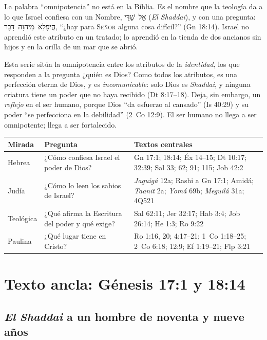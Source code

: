 \documentclass[11pt,letterpaper]{article}
\newcommand{\heb}[1]{\mbox{\foreignlanguage{hebrew}{#1}}}
\newcommand{\SENOR}{\textsc{Señor}}
\begin{document}
La palabra ``omnipotencia'' no está en la Biblia. Es el nombre que la teología da a lo que Israel confiesa con un Nombre, \heb{אֵל שַׁדַּי} (\emph{El Shaddai}), y con una pregunta: \heb{הֲיִפָּלֵא מֵיְהוָה דָּבָר}, ``¿hay para \SENOR{} alguna cosa difícil?'' (Gn 18:14). Israel no aprendió este atributo en un tratado; lo aprendió en la tienda de dos ancianos sin hijos y en la orilla de un mar que se abrió.

Esta serie sitúa la omnipotencia entre los atributos de la \emph{identidad}, los que responden a la pregunta ¿quién es Dios? Como todos los atributos, es una perfección eterna de Dios, y es \emph{incomunicable}: solo Dios es \emph{Shaddai}, y ninguna criatura tiene un poder que no haya recibido (Dt 8:17--18). Deja, sin embargo, un \emph{reflejo} en el ser humano, porque Dios ``da esfuerzo al cansado'' (Is 40:29) y su poder ``se perfecciona en la debilidad'' (2~Co 12:9). El ser humano no llega a ser omnipotente; llega a ser fortalecido.

\begin{center}\small\renewcommand{\arraystretch}{1.25}
\begin{tabular}{@{}L{2.6cm}L{5.4cm}L{6.4cm}@{}}
\toprule
\textbf{Mirada} & \textbf{Pregunta} & \textbf{Textos centrales} \\ \midrule
Hebrea & ¿Cómo confiesa Israel el poder de Dios? & Gn 17:1; 18:14; Éx 14--15; Dt 10:17; 32:39; Sal 33; 62; 91; 115; Job 42:2 \\
Judía & ¿Cómo lo leen los sabios de Israel? & \emph{Jaguigá} 12a; Rashi a Gn 17:1; Amidá; \emph{Taanit} 2a; \emph{Yomá} 69b; \emph{Meguilá} 31a; 4Q521 \\
Teológica & ¿Qué afirma la Escritura del poder y qué exige? & Sal 62:11; Jer 32:17; Hab 3:4; Job 26:14; He 1:3; Ro 9:22 \\
Paulina & ¿Qué lugar tiene en Cristo? & Ro 1:16, 20; 4:17--21; 1~Co 1:18--25; 2~Co 6:18; 12:9; Ef 1:19--21; Flp 3:21 \\
\bottomrule
\end{tabular}\end{center}

\section{Texto ancla: Génesis 17:1 y 18:14}

\subsection{\emph{El Shaddai} a un hombre de noventa y nueve años}
\end{document}
